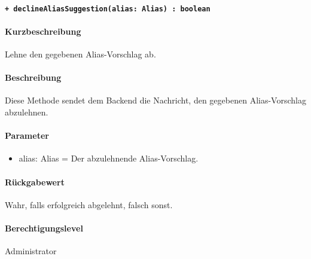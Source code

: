 \paragraph{\texttt{+ declineAliasSuggestion(alias: Alias) : boolean}}%
\paragraph*{Kurzbeschreibung}
Lehne den gegebenen Alias-Vorschlag ab.
\paragraph*{Beschreibung}
Diese Methode sendet dem Backend die Nachricht, den gegebenen Alias-Vorschlag abzulehnen.
\paragraph*{Parameter}
\begin{itemize}
    \item alias: Alias = Der abzulehnende Alias-Vorschlag.
\end{itemize}
\paragraph*{Rückgabewert}
Wahr, falls erfolgreich abgelehnt, falsch sonst.
\paragraph*{Berechtigungslevel}
Administrator